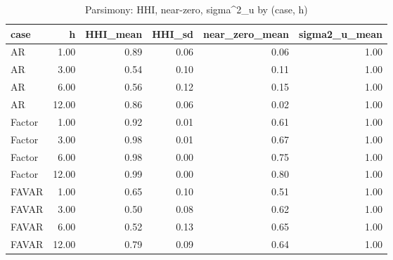 \begin{table}[ht]
\centering
\begin{tabular}{lrrrrr}
  \hline
case & h & HHI\_mean & HHI\_sd & near\_zero\_mean & sigma2\_u\_mean \\ 
  \hline
AR & 1.00 & 0.89 & 0.06 & 0.06 & 1.00 \\ 
  AR & 3.00 & 0.54 & 0.10 & 0.11 & 1.00 \\ 
  AR & 6.00 & 0.56 & 0.12 & 0.15 & 1.00 \\ 
  AR & 12.00 & 0.86 & 0.06 & 0.02 & 1.00 \\ 
  Factor & 1.00 & 0.92 & 0.01 & 0.61 & 1.00 \\ 
  Factor & 3.00 & 0.98 & 0.01 & 0.67 & 1.00 \\ 
  Factor & 6.00 & 0.98 & 0.00 & 0.75 & 1.00 \\ 
  Factor & 12.00 & 0.99 & 0.00 & 0.80 & 1.00 \\ 
  FAVAR & 1.00 & 0.65 & 0.10 & 0.51 & 1.00 \\ 
  FAVAR & 3.00 & 0.50 & 0.08 & 0.62 & 1.00 \\ 
  FAVAR & 6.00 & 0.52 & 0.13 & 0.65 & 1.00 \\ 
  FAVAR & 12.00 & 0.79 & 0.09 & 0.64 & 1.00 \\ 
   \hline
\end{tabular}
\caption{Parsimony: HHI, near-zero, sigma^2_u by (case, h)} 
\label{tab:parsimony}
\end{table}
